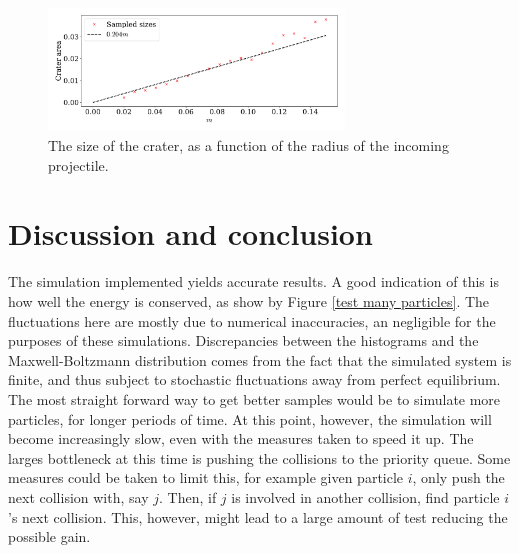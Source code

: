 \documentclass{article}
\begin{document}
            \begin{figure}[h!]
                \centering
                \includegraphics[width=0.7\textwidth]{../plots/problem4/crater_size.pdf}
                \caption{The size of the crater, as a function of the radius of the incoming projectile.}
                \label{crater size}
            \end{figure}

            \section*{Discussion and conclusion}
            The simulation implemented yields accurate results. A good indication of this is how well the energy is conserved, as show by Figure \ref{test many particles}. The fluctuations here are mostly due to numerical inaccuracies, an negligible for the purposes of these simulations. Discrepancies between the histograms and the Maxwell-Boltzmann distribution comes from the fact that the simulated system is finite, and thus subject to stochastic fluctuations away from perfect equilibrium. The most straight forward way to get better samples would be to simulate more particles, for longer periods of time. At this point, however, the simulation will become increasingly slow, even with the measures taken to speed it up. The larges bottleneck at this time is pushing the collisions to the priority queue. Some measures could be taken to limit this, for example given particle $i$, only push the next collision with, say $j$. Then, if $j$ is involved in another collision, find particle $i$'s next collision. This, however, might lead to a large amount of test reducing the possible gain.

    
       
\end{document}
